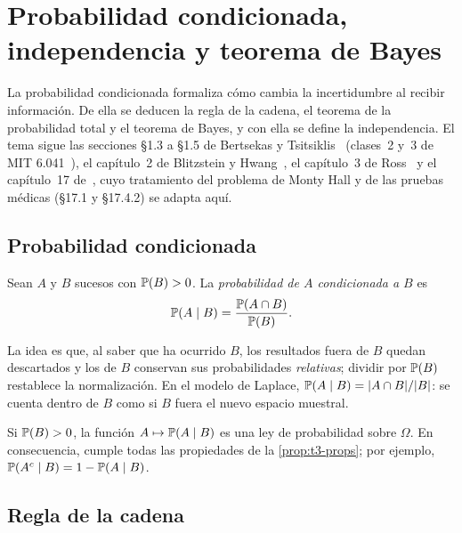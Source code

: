 \chapter{Probabilidad condicionada, independencia y teorema de Bayes}
\label{tema:4}

La probabilidad condicionada formaliza cómo cambia la incertidumbre al recibir información. De ella se deducen la regla de la cadena, el teorema de la probabilidad total y el teorema de Bayes, y con ella se define la independencia. El tema sigue las secciones §1.3 a §1.5 de Bertsekas y Tsitsiklis~\cite{bt} (clases~2 y~3 de MIT 6.041~\cite{mit6041f10}), el capítulo~2 de Blitzstein y Hwang~\cite{bh}, el capítulo~3 de Ross~\cite{ross} y el capítulo~17 de~\cite{mcs}, cuyo tratamiento del problema de Monty Hall y de las pruebas médicas (§17.1 y §17.4.2) se adapta aquí.

\section{Probabilidad condicionada}

\begin{definicion}
Sean $A$ y $B$ sucesos con $\mathbb{P}(B)>0$. La \emph{probabilidad de $A$ condicionada a $B$} es
\[
\mathbb{P}(A\mid B)=\frac{\mathbb{P}(A\cap B)}{\mathbb{P}(B)}.
\]
\end{definicion}

La idea es que, al saber que ha ocurrido $B$, los resultados fuera de $B$ quedan descartados y los de $B$ conservan sus probabilidades \emph{relativas}; dividir por $\mathbb{P}(B)$ restablece la normalización. En el modelo de Laplace, $\mathbb{P}(A\mid B)=\lvert A\cap B\rvert/\lvert B\rvert$: se cuenta dentro de $B$ como si $B$ fuera el nuevo espacio muestral.

\begin{proposicion}\label{prop:t4-esprob}
Si $\mathbb{P}(B)>0$, la función $A\mapsto\mathbb{P}(A\mid B)$ es una ley de probabilidad sobre $\Omega$. En consecuencia, cumple todas las propiedades de la \cref{prop:t3-props}; por ejemplo, $\mathbb{P}(A^{c}\mid B)=1-\mathbb{P}(A\mid B)$.
\end{proposicion}

\addtocounter{definicion}{1}%

\section{Regla de la cadena}

